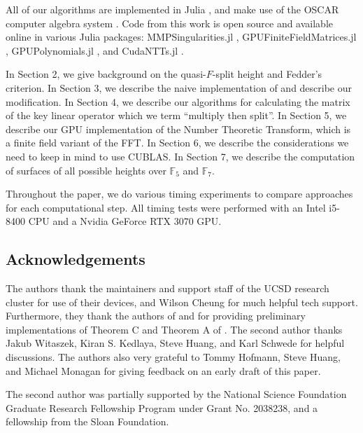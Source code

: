 All of our algorithms are implemented in Julia 
\cite{julia-2017}, and
make use of the OSCAR computer algebra system 
\cite{OSCAR-book}.
Code from this work is open source and available online 
in various
Julia packages: 
MMPSingularities.jl \cite{mmpsingularities-jl},
GPUFiniteFieldMatrices.jl \cite{gpuffmatrices-jl}, 
GPUPolynomials.jl \cite{gpupolynomials-jl},
and CudaNTTs.jl \cite{cudantts-jl}.

In Section 2, we give background on the quasi-\(F\)-split height
and Fedder's criterion.
In Section 3, we describe the naive implementation of
\cite[Theorem~C]{kty-2022-fedder} and describe
our modification.
In Section 4, we describe our algorithms for calculating the matrix
of the key linear operator which we term ``multiply then split''.
In Section 5, we describe our GPU implementation of the Number Theoretic
Transform, which is a finite field variant of the FFT.
In Section 6, we describe the considerations we need to keep in mind
to use CUBLAS.
In Section 7, we describe the computation of surfaces of all possible
heights over \(\mathbb{F}_{5}\) and \(\mathbb{F}_{7}\).

Throughout the paper, we do various timing experiments to compare 
approaches for each computational step.
All timing tests were performed with 
an Intel i5-8400 CPU and a Nvidia GeForce RTX 3070 GPU.

\subsection{Acknowledgements}

The authors thank the maintainers and support staff 
of the UCSD research cluster for use of their devices,
and Wilson Cheung for much helpful tech support.
Furthermore, they thank the authors of 
\cite{kty-2022-fedder} 
and \cite{fgmqt-2025-witt-vectors-macaulay2}
for providing preliminary implementations of 
Theorem C and Theorem A
of \cite{kty-2022-fedder}.
The second author thanks Jakub Witaszek, Kiran S. Kedlaya,
Steve Huang, and Karl Schwede for helpful discussions.
The authors also very grateful to 
Tommy Hofmann, Steve Huang, and 
Michael Monagan for giving feedback on an early draft of
this paper.

The second author was partially supported by the 
National Science Foundation Graduate Research
Fellowship Program under Grant No. 2038238, and a fellowship
from the Sloan Foundation.
